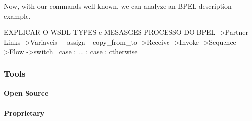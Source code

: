 \documentclass[12pt,a4paper]{article}
\begin{document}
Now, with our commands well known, we can analyze an BPEL description example.

\begin{center}
  EXPLICAR O WSDL TYPES e MESASGES
  PROCESSO DO BPEL
  ->Partner Links
  ->Variaveis + assign +copy_from_to
  ->Receive
  ->Invoke
  ->Sequence
  ->Flow
  ->switch : case : ... : case : otherwise
\end{center}


\subsubsection{Tools}
\paragraph{Open Source}

\paragraph{Proprietary}
\end{document}
